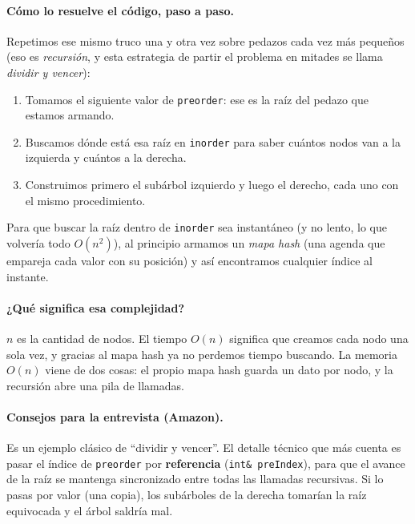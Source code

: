 \paragraph{Cómo lo resuelve el código, paso a paso.} Repetimos ese mismo truco
una y otra vez sobre pedazos cada vez más pequeños (eso es \emph{recursión}, y
esta estrategia de partir el problema en mitades se llama \emph{dividir y
vencer}):
\begin{enumerate}
    \item Tomamos el siguiente valor de \texttt{preorder}: ese es la raíz del pedazo que estamos armando.
    \item Buscamos dónde está esa raíz en \texttt{inorder} para saber cuántos nodos van a la izquierda y cuántos a la derecha.
    \item Construimos primero el subárbol izquierdo y luego el derecho, cada uno con el mismo procedimiento.
\end{enumerate}
Para que buscar la raíz dentro de \texttt{inorder} sea instantáneo (y no lento,
lo que volvería todo $O(n^2)$), al principio armamos un \emph{mapa hash} (una
agenda que empareja cada valor con su posición) y así encontramos cualquier
índice al instante.




\paragraph{¿Qué significa esa complejidad?} $n$ es la cantidad de nodos. El
tiempo $O(n)$ significa que creamos cada nodo una sola vez, y gracias al mapa
hash ya no perdemos tiempo buscando. La memoria $O(n)$ viene de dos cosas: el
propio mapa hash guarda un dato por nodo, y la recursión abre una pila de
llamadas.

\paragraph{Consejos para la entrevista (Amazon).} Es un ejemplo clásico de
``dividir y vencer''. El detalle técnico que más cuenta es pasar el índice de
\texttt{preorder} por \textbf{referencia} (\texttt{int\& preIndex}), para que el
avance de la raíz se mantenga sincronizado entre todas las llamadas recursivas.
Si lo pasas por valor (una copia), los subárboles de la derecha tomarían la raíz
equivocada y el árbol saldría mal.
